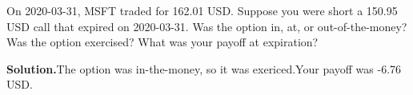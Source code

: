\noindent On 2020-03-31, MSFT traded for 162.01 USD. Suppose you were short a 150.95 USD call that expired on 2020-03-31. Was the option in, at, or out-of-the-money? Was the option exercised? What was your payoff at expiration?

\vspace{9pt} 

\textbf{Solution.}The option was in-the-money, so it was exericed.Your payoff was -6.76 USD.
